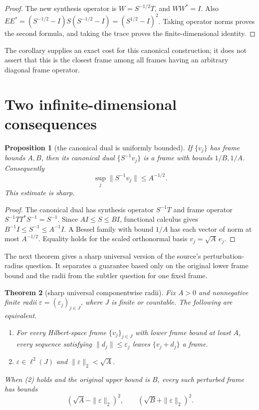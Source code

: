 \documentclass[11pt]{article}
\newtheorem{theorem}{Theorem}
\newtheorem{proposition}[theorem]{Proposition}
\begin{document}
\begin{proof}
The new synthesis operator is \(W=S^{-1/2}T\), and \(WW^*=I\). Also
\(EE^*=(S^{-1/2}-I)S(S^{-1/2}-I)=(S^{1/2}-I)^2\). Taking operator norms
proves the second formula, and taking the trace proves the finite-dimensional
identity.
\end{proof}

The corollary supplies an exact cost for this canonical construction; it
does not assert that this is the closest frame among all frames having an
arbitrary diagonal frame operator.

\section{Two infinite-dimensional consequences}

\begin{proposition}[the canonical dual is uniformly bounded]\label{prop:dual}
If \(\{v_j\}\) has frame bounds \(A,B\), then its canonical dual
\(\{S^{-1}v_j\}\) is a frame with bounds \(1/B,1/A\). Consequently
\[
 \sup_j\|S^{-1}v_j\|\le A^{-1/2}.
\]
This estimate is sharp.
\end{proposition}

\begin{proof}
The canonical dual has synthesis operator \(S^{-1}T\) and frame operator
\(S^{-1}TT^*S^{-1}=S^{-1}\). Since \(AI\le S\le BI\), functional calculus
gives \(B^{-1}I\le S^{-1}\le A^{-1}I\). A Bessel family with bound \(1/A\)
has each vector of norm at most \(A^{-1/2}\). Equality holds for the scaled
orthonormal basis \(v_j=\sqrt A\,e_j\).
\end{proof}

The next theorem gives a sharp universal version of the source's
perturbation-radius question. It separates a guarantee based only on the
original lower frame bound and the radii from the subtler question for one
fixed frame.

\begin{theorem}[sharp universal componentwise radii]\label{thm:radii}
Fix \(A>0\) and nonnegative finite radii
\(\varepsilon=(\varepsilon_j)_{j\in J}\), where \(J\) is finite or countable.
The following are equivalent.
\begin{enumerate}
\item For every Hilbert-space frame \(\{v_j\}_{j\in J}\) with lower frame
bound at least \(A\), every sequence satisfying
\(\|d_j\|\le\varepsilon_j\) leaves \(\{v_j+d_j\}\) a frame.
\item \(\varepsilon\in\ell^2(J)\) and
\(\|\varepsilon\|_2<\sqrt A\).
\end{enumerate}
When (2) holds and the original upper bound is \(B\), every such perturbed
frame has bounds
\[
 (\sqrt A-\|\varepsilon\|_2)^2,
 \qquad
 (\sqrt B+\|\varepsilon\|_2)^2.
\]
\end{theorem}
\end{document}
